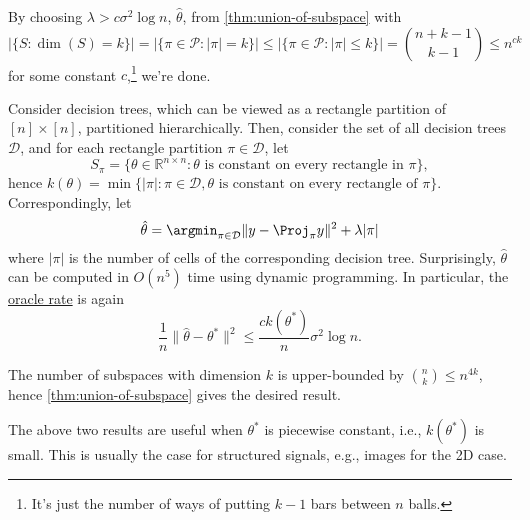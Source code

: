 \begin{explanation}
	By choosing \(\lambda > c \sigma ^2 \log n\), \(\hat{\theta} \), from \autoref{thm:union-of-subspace} with
	\[
		\vert \{ S \colon \dim (S) = k \} \vert
		= \vert \{\pi \in \mathcal{P} \colon \vert \pi \vert = k \} \vert
		\leq \vert \{\pi \in \mathcal{P} \colon \vert \pi \vert \leq k \} \vert
		= \binom{n+k-1}{k-1}
		\leq n^{ck}
	\]
	for some constant \(c\),\footnote{It's just the number of ways of putting \(k-1\) bars between \(n\) balls.} we're done.
\end{explanation}

\begin{eg}
	Consider decision trees, which can be viewed as a rectangle partition of \([n] \times [n]\), partitioned hierarchically. Then, consider the set of all decision trees \(\mathcal{D} \), and for each rectangle partition \(\pi \in \mathcal{D} \), let
	\[
		S_\pi = \{ \theta \in \mathbb{R} ^{n \times n} \colon \theta \text{ is constant on every rectangle in } \pi \},
	\]
	hence \(k(\theta )= \min \{ \vert \pi \vert \colon \pi \in \mathcal{D} , \theta \text{ is constant on every rectangle of } \pi \} \). Correspondingly, let
	\[
		\hat{\theta} = \argmin_{\pi \in \mathcal{D} } \lVert y - \Proj_\pi y \rVert ^2 + \lambda \vert \pi \vert
	\]
	where \(\vert \pi  \vert \) is the number of cells of the corresponding decision tree. Surprisingly, \(\hat{\theta} \) can be computed in \(O(n^5)\) time using dynamic programming. In particular, the \hyperref[not:oracle-rate]{oracle rate} is again
	\[
		\frac{1}{n} \lVert \hat{\theta} - \theta ^{\ast}  \rVert ^2
		\leq \frac{c k(\theta ^{\ast} )}{n} \sigma ^2 \log n.
	\]
\end{eg}
\begin{explanation}
	The number of subspaces with dimension \(k\) is upper-bounded by \(\binom{n}{k} \leq n^{4k}\), hence \autoref{thm:union-of-subspace} gives the desired result.
\end{explanation}

\begin{note}
	The above two results are useful when \(\theta ^{\ast} \) is piecewise constant, i.e., \(k(\theta ^{\ast} )\) is small. This is usually the case for structured signals, e.g., images for the 2D case.
\end{note}